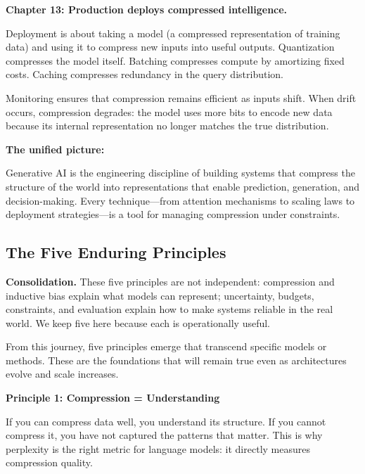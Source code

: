 \textbf{Chapter 13: Production deploys compressed intelligence.}

Deployment is about taking a model (a compressed representation of training data) and using it to compress new inputs into useful outputs. Quantization compresses the model itself. Batching compresses compute by amortizing fixed costs. Caching compresses redundancy in the query distribution.

Monitoring ensures that compression remains efficient as inputs shift. When drift occurs, compression degrades: the model uses more bits to encode new data because its internal representation no longer matches the true distribution.

\vspace{1em}

\textbf{The unified picture:}

Generative AI is the engineering discipline of building systems that compress the structure of the world into representations that enable prediction, generation, and decision-making. Every technique---from attention mechanisms to scaling laws to deployment strategies---is a tool for managing compression under constraints.

\vspace{1em}

\subsection{The Five Enduring Principles}

\vspace{0.3cm}
\textbf{Consolidation.} These five principles are not independent: compression and inductive bias explain what models can represent; uncertainty, budgets, constraints, and evaluation explain how to make systems reliable in the real world. We keep five here because each is operationally useful.

From this journey, five principles emerge that transcend specific models or methods. These are the foundations that will remain true even as architectures evolve and scale increases.

\vspace{0.5em}

\textbf{Principle 1: Compression = Understanding}

If you can compress data well, you understand its structure. If you cannot compress it, you have not captured the patterns that matter. This is why perplexity is the right metric for language models: it directly measures compression quality.

